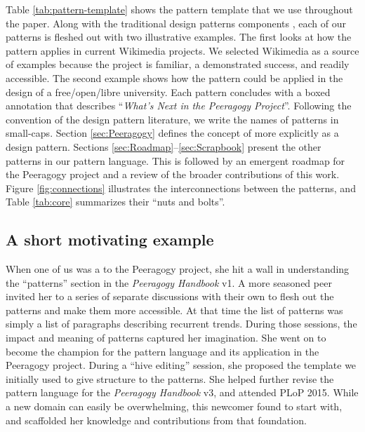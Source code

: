 Table \ref{tab:pattern-template} shows the pattern template that we use throughout the paper.  
Along with the traditional design patterns components \cite{meszaros1998pattern}, each of our patterns is fleshed out with two illustrative examples.  The first looks at how the pattern applies in current Wikimedia projects.  We selected Wikimedia as a source of examples because the project is familiar, a demonstrated success, and readily accessible.  The second example shows how the pattern could be applied in the design of a free\slash open\slash libre university.  Each pattern concludes with a boxed annotation that describes ``\emph{What's Next in the Peeragogy Project}''.
%
Following the convention of the design pattern literature, we write
the names of patterns in small-caps.  Section \ref{sec:Peeragogy}
defines the concept of  more explicitly as a design pattern.  Sections
\ref{sec:Roadmap}--\ref{sec:Scrapbook} present the other patterns in
our pattern language.  This is followed by an emergent roadmap for the Peeragogy
project and a review of the broader contributions of this work.  Figure
\ref{fig:connections} illustrates the interconnections between the
patterns, and Table \ref{tab:core} summarizes their ``nuts and
bolts''.

\subsection*{A short motivating example}
When one of us was a  to the Peeragogy project, she hit a wall in understanding the ``patterns'' section in the \emph{Peeragogy Handbook} v1.  A more seasoned peer invited her to a series of separate discussions with their own  to flesh out the patterns and make them more accessible.  At that time the list of patterns was simply a list of paragraphs describing recurrent trends.  During those sessions, the impact and meaning of patterns captured her imagination.  She went on to become the champion for the pattern language and its application in the Peeragogy project.  During a ``hive editing'' session, she proposed the template we initially used to give structure to the patterns.  She helped further revise the pattern language for the \emph{Peeragogy Handbook}  v3, and attended PLoP 2015.  While a new domain can easily be overwhelming, this newcomer found  to start with, and scaffolded her knowledge and contributions from that foundation.

